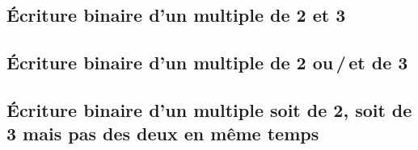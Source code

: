 \subsection{Écriture binaire d'un multiple de 2 et 3}

    


\newpage
\subsection{Écriture binaire d'un multiple de 2 ou\,/\,et de 3}

    



\newpage
\subsection{Écriture binaire d'un multiple soit de 2, soit de 3 mais pas des deux en même temps}

    
